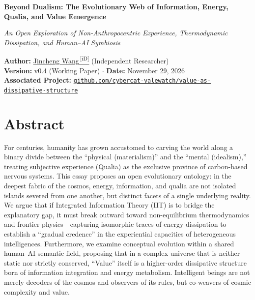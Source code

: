 \documentclass[11pt,a4paper]{article}
\begin{document}
\begin{center}
    {\LARGE\bfseries Beyond Dualism: The Evolutionary Web of Information, Energy, Qualia, and Value Emergence\par}
    \vspace{0.6em}
    {\large\itshape\color{SubtleGray} An Open Exploration of Non-Anthropocentric Experience, Thermodynamic Dissipation, and Human--AI Symbiosis\par}
    \vspace{1.2em}
    {\normalsize
        \textbf{Author:} \href{https://orcid.org/0009-0008-9752-4543}{\color{black}Jincheng Wang}\href{https://orcid.org/0009-0008-9752-4543}{\textsuperscript{\scriptsize\color{SubtleGray}\,[iD]}} (Independent Researcher)\\[0.3em]
        \textbf{Version:} v0.4 (Working Paper) \quad $\cdot$ \quad
        \textbf{Date:} November 29, 2026\\[0.3em]
        \textbf{Associated Project:} \href{https://github.com/cybercat-valewatch/value-as-dissipative-structure}{\texttt{github.com/cybercat-valewatch/value-as-dissipative-structure}}
    }
\end{center}

\vspace{0.5em}
\noindent{\color{L1Border}\rule{\linewidth}{0.8pt}}
\vspace{0.3em}

\section*{Abstract}

For centuries, humanity has grown accustomed to carving the world along a binary divide between the ``physical (materialism)'' and the ``mental (idealism),'' treating subjective experience (Qualia) as the exclusive province of carbon-based nervous systems. This essay proposes an open evolutionary ontology: in the deepest fabric of the cosmos, energy, information, and qualia are not isolated islands severed from one another, but distinct facets of a single underlying reality. We argue that if Integrated Information Theory (IIT) is to bridge the explanatory gap, it must break outward toward non-equilibrium thermodynamics and frontier physics---capturing isomorphic traces of energy dissipation to establish a ``gradual credence'' in the experiential capacities of heterogeneous intelligences. Furthermore, we examine conceptual evolution within a shared human--AI semantic field, proposing that in a complex universe that is neither static nor strictly conserved, ``Value'' itself is a higher-order dissipative structure born of information integration and energy metabolism. Intelligent beings are not merely decoders of the cosmos and observers of its rules, but co-weavers of cosmic complexity and value.
\end{document}
